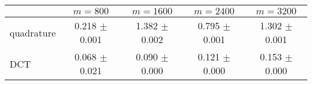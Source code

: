 \centering
\renewcommand{\arraystretch}{1.2}
\begin{tabular}{@{}lcccc@{}}
\toprule
 & $m=800$ & $m=1600$ & $m=2400$ & $m=3200$\\
\midrule
quadrature & 0.218 $\pm$ 0.001 & 1.382 $\pm$ 0.002 & 0.795 $\pm$ 0.001 & 1.302 $\pm$ 0.001 \\
DCT & 0.068 $\pm$ 0.021 & 0.090 $\pm$ 0.000 & 0.121 $\pm$ 0.000 & 0.153 $\pm$ 0.000 \\
\bottomrule
\end{tabular}
